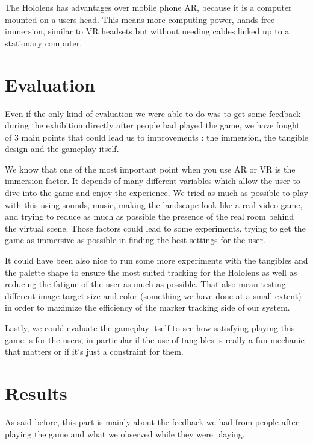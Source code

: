 \documentclass[sigchi, authorversion, screen]{acmart}
\begin{document}
The Hololens has advantages over mobile phone AR, because it is a computer mounted on a users head. This means more computing power, hands free immersion, similar to VR headsets but without needing cables linked up to a stationary computer. 



\section{Evaluation}

Even if the only kind of evaluation we were able to do was to get some feedback during the exhibition directly after people had played the game, we have fought of 3 main points that could lead us to improvements : the immersion, the tangible design and the gameplay itself.

We know that one of the most important point when you use AR or VR is the immersion factor. It depends of many different variables which allow the user to dive into the game and enjoy the experience. We tried as much as possible to play with this using sounds, music, making the landscape look like a real video game, and trying to reduce as much as possible the presence of the real room behind the virtual scene. Those factors could lead to some experiments, trying to get the game as immersive as possible in finding the best settings for the user.

It could have been also nice to run some more experiments with the tangibles and the palette shape to ensure the most suited tracking for the Hololens as well as reducing the fatigue of the user as much as possible. That also mean testing different image target size and color (something we have done at a small extent) in order to maximize the efficiency of the marker tracking side of our system.

Lastly, we could evaluate the gameplay itself to see how satisfying playing this game is for the users, in particular if the use of tangibles is really a fun mechanic that matters or if it’s just a constraint for them.



\section{Results}

As said before, this part is mainly about the feedback we had from people after playing the game and what we observed while they were playing. 
\end{document}
